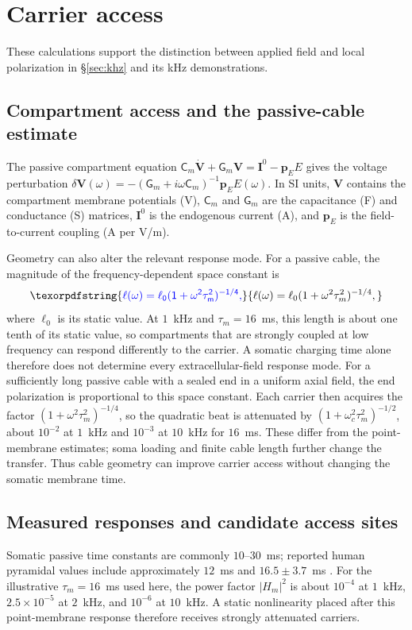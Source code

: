 \documentclass[11pt,a4paper]{article}
\providecommand{\DIFaddtex}[1]{{\protect\color{blue} \sf #1}} %
\providecommand{\DIFadd}[1]{\texorpdfstring{\DIFaddtex{#1}}{#1}} %
\begin{document}
\section{\DIFadd{Carrier access}}\label{supp:access}
\DIFadd{These calculations support the distinction between applied field and local
polarization in \S\ref{sec:khz} and its kHz demonstrations.
}\subsection{\DIFadd{Compartment access and the passive-cable estimate}}\label{app:access}
\DIFadd{The passive compartment equation $\mathsf C_m\dot{\mathbf V}+\mathsf G_m\mathbf V=\mathbf I^0-\mathbf p_EE$
\cite{ruffini2021nmm2} gives the voltage perturbation
$\delta\mathbf V(\omega)=-(\mathsf G_m+i\omega\mathsf C_m)^{-1}\mathbf p_EE(\omega)$. In SI units, $\mathbf V$ contains the compartment membrane potentials (V), $\mathsf C_m$ and
$\mathsf G_m$ are the capacitance (F) and conductance (S) matrices, $\mathbf I^0$ is the
endogenous current (A), and $\mathbf p_E$ is the field-to-current coupling
(A per V/m).
}

\DIFadd{Geometry can also alter the relevant response mode. For a passive cable, the
magnitude of the frequency-dependent space constant is
}\begin{equation}
\DIFadd{\ell(\omega)=\ell_0(1+\omega^2\tau_m^2)^{-1/4},
\label{eq:lambda}
}\end{equation}
\DIFadd{where $\ell_0$ is its static value. At $1$~kHz and $\tau_m=16$~ms, this length
is about one tenth of its static value, so compartments that are strongly coupled
at low frequency can respond differently to the carrier. A somatic charging time
alone therefore does not determine every extracellular-field response mode.
For a sufficiently long passive cable with a sealed end in a uniform axial field,
the end polarization is proportional to this space constant. Each carrier then
acquires the factor $(1+\omega^2\tau_m^2)^{-1/4}$, so the quadratic beat is
attenuated by $(1+\omega_c^2\tau_m^2)^{-1/2}$, about $10^{-2}$ at $1$~kHz and
$10^{-3}$ at $10$~kHz for $16$~ms. These differ from the point-membrane estimates;
soma loading and finite cable length further change the transfer.
Thus cable geometry can improve carrier access without changing the somatic
membrane time.
}

\subsection{\DIFadd{Measured responses and candidate access sites}}
\DIFadd{Somatic passive time constants are commonly $10$--$30$~ms; reported human pyramidal
values include approximately $12$~ms \cite{deitcher2017} and $16.5\pm3.7$~ms
\cite{eyal2016}. For the illustrative $\tau_m=16$~ms used here, the power factor
$|H_m|^2$ is about $10^{-4}$ at $1$~kHz, $2.5\times10^{-5}$ at $2$~kHz, and
$10^{-6}$ at $10$~kHz. A static nonlinearity placed after this point-membrane response
therefore receives strongly attenuated carriers.
}
\end{document}
